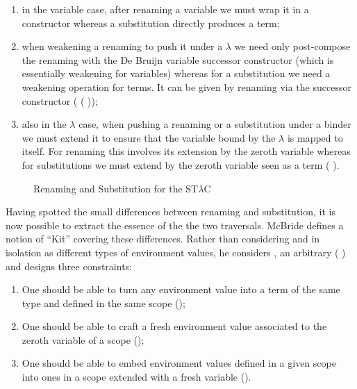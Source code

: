 \begin{enumerate}
  \item
    in the variable case, after renaming a variable we must wrap it
    in a  constructor whereas a substitution directly
    produces a term;
  \item
    when weakening a renaming to push it under a $λ$ we need only
    post-compose the renaming with the De Bruijn variable successor
    constructor  (which is essentially weakening for variables)
    whereas for a substitution we need a weakening operation for terms.
    It can be given by renaming via the successor constructor
    ( ( ));
  \item
    also in the $λ$ case, when pushing a renaming or a substitution under
    a binder we must extend it to ensure that the variable bound by the
    $λ$ is mapped to itself. For renaming this involves its extension by
    the zeroth variable  whereas for substitutions we must extend by
    the zeroth variable seen as a term ( ).
\end{enumerate}

\begin{figure}[h]
\caption{Renaming\label{ren} and Substitution\label{sub} for the ST$λ$C}
\end{figure}

Having spotted the small differences between renaming and substitution,
it is now possible to extract the essence of the the two traversals.
McBride defines a notion of ``Kit'' covering these differences. Rather
than considering  and  in isolation as different types
of environment values, he considers , an arbitrary
( ) and designs three constraints:

\begin{enumerate}
  \item
    One should be able to turn any environment value into a term of
    the same type and defined in the same scope ();
  \item
    One should be able to craft a fresh environment value associated
    to the zeroth variable of a scope ();
  \item
    One should be able to embed environment values defined in a given
    scope into ones in a scope extended with a fresh variable ().
\end{enumerate}

